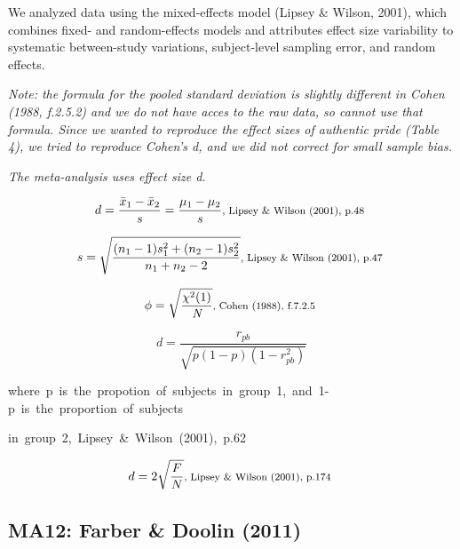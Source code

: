 \documentclass{article}
\begin{document}
We analyzed data using the mixed-effects model (Lipsey \& Wilson, 2001), which combines fixed- and random-effects models and attributes effect size variability to systematic between-study variations, subject-level sampling error, and random effects.

\vspace{3 mm}
\textit{Note: the formula for the pooled standard deviation is slightly different in Cohen (1988, f.2.5.2) and we do not have acces to the raw data, so cannot use that formula. Since we wanted to reproduce the effect sizes of authentic pride (Table 4), we tried to reproduce Cohen's d, and we did not correct for small sample bias.}

\vspace{3mm}
\textit{The meta-analysis uses effect size d.}

\begin{equation*}
d={\frac {{\bar {x}}_{1}-{\bar {x}}_{2}}{s}}={\frac {\mu_{1}-\mu_{2}}{s}}  \mbox {\footnotesize, Lipsey \& Wilson (2001), p.48 } 
\end{equation*}

\begin{equation*}
s={\sqrt {\frac {(n_{1}-1)s_{1}^{2}+(n_{2}-1)s_{2}^{2}}{n_{1}+n_{2}-2}}} \mbox{\footnotesize,  Lipsey \& Wilson (2001), p.47 } 
\end{equation*}

\begin{equation*}
\phi = {\sqrt {\frac {\chi ^{2}(1)}{\textit{N}}}} \mbox{\footnotesize, Cohen (1988), f.7.2.5 } 
\end{equation*}

\begin{equation*}
d = {\frac {\textit{r}_{pb}}{\sqrt{  p(1-p)(1-r_{pb}^{2})  }}}
\end{equation*}

\mbox{\footnotesize where p is the propotion of subjects in group 1, and 1-p is the proportion of subjects }

\mbox{\footnotesize  in group 2, Lipsey \& Wilson (2001), p.62 } 

\begin{equation*}
d= 2 {\sqrt {\frac {F}{N}}} \mbox{\footnotesize, Lipsey \& Wilson (2001), p.174 }
\end{equation*}

\subsection*{MA12: Farber \& Doolin (2011)}
\end{document}
